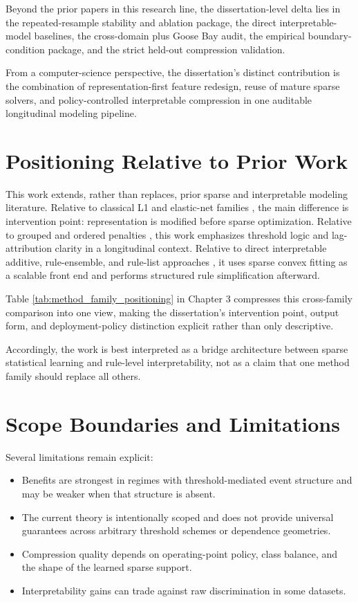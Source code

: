 Beyond the prior papers in this research line, the dissertation-level delta lies in the repeated-resample stability and ablation package, the direct interpretable-model baselines, the cross-domain plus Goose Bay audit, the empirical boundary-condition package, and the strict held-out compression validation.

From a computer-science perspective, the dissertation's distinct contribution is the combination of representation-first feature redesign, reuse of mature sparse solvers, and policy-controlled interpretable compression in one auditable longitudinal modeling pipeline.

\section{Positioning Relative to Prior Work}

This work extends, rather than replaces, prior sparse and interpretable modeling literature. Relative to classical L1 and elastic-net families \autocite{tibshirani1996,HZou2005Regularization,HZou2006adaptive,fried2010,tay2023}, the main difference is intervention point: representation is modified before sparse optimization. Relative to grouped and ordered penalties \autocite{turlach2005,yuan2006,meier2008,yang2015,RTibshirani2016ordered}, this work emphasizes threshold logic and lag-attribution clarity in a longitudinal context. Relative to direct interpretable additive, rule-ensemble, and rule-list approaches \autocites{lou2012intelligible,friedman2008rulefit,EAngelino2018Learning}, it uses sparse convex fitting as a scalable front end and performs structured rule simplification afterward.

Table \ref{tab:method_family_positioning} in Chapter 3 compresses this cross-family comparison into one view, making the dissertation's intervention point, output form, and deployment-policy distinction explicit rather than only descriptive.

Accordingly, the work is best interpreted as a bridge architecture between sparse statistical learning and rule-level interpretability, not as a claim that one method family should replace all others.

\section{Scope Boundaries and Limitations}

Several limitations remain explicit:
\begin{itemize}
	\item Benefits are strongest in regimes with threshold-mediated event structure and may be weaker when that structure is absent.
	\item The current theory is intentionally scoped and does not provide universal guarantees across arbitrary threshold schemes or dependence geometries.
	\item Compression quality depends on operating-point policy, class balance, and the shape of the learned sparse support.
	\item Interpretability gains can trade against raw discrimination in some datasets.
\end{itemize}

